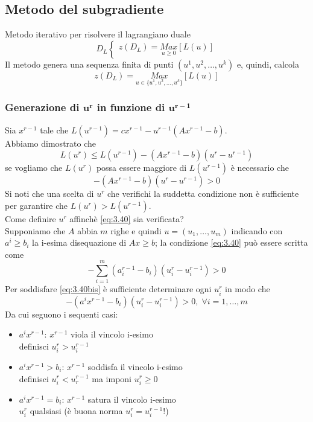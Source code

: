 \subsection{Metodo del subgradiente}
Metodo iterativo per risolvere il lagrangiano duale
\begin{equation*}
	D_{L}
	\begin{cases}
		z(D_{L})=\underset{u\ge 0}{Max}[L(u)]
	\end{cases}
\end{equation*}
Il metodo genera una sequenza finita di punti $(u^{1},u^{2},\dots,u^{k})$ e, quindi, calcola
\begin{equation*}
	z(D_{L})=\underset{u\in \{u^{1},u^{2},\dots,u^{k}\}}{Max}[L(u)]
\end{equation*}
\subsubsection{Generazione di $\boldsymbol{u^{r}}$ in funzione di $\boldsymbol{u^{r-1}}$}
Sia $x^{r-1}$ tale che $L(u^{r-1})=cx^{r-1}-u^{r-1}(Ax^{r-1}-b)$.\\
Abbiamo dimostrato che
\begin{equation}
	L(u^{r})\le L(u^{r-1})-(Ax^{r-1}-b)(u^{r}-u^{r-1})
\end{equation}
se vogliamo che $L(u^{r})$ possa essere maggiore di $L(u^{r-1})$ è necessario che
\begin{equation}
	-(Ax^{r-1}-b)(u^{r}-u^{r-1})>0 \label{eq:3.40}
\end{equation}
Si noti che una scelta di $u^{r}$ che verifichi la suddetta condizione non è sufficiente per garantire che $L(u^{r})>L(u^{r-1})$.\\
Come definire $u^{r}$ affinchè \ref{eq:3.40} sia verificata?\\
Supponiamo che $A$ abbia $m$ righe e quindi $u=(u_{1},\dots,u_{m})$ indicando con $a^{i}\ge b_{i}$ la i-esima disequazione di $Ax\ge b$; la condizione \ref{eq:3.40} può essere scritta come
\begin{equation*}
	-\sum_{i=1}^{m}(a_{i}^{r-1}-b_{i})(u_{i}^{r}-u_{i}^{r-1})>0 \label{eq:3.40bis}
\end{equation*}
Per soddisfare \ref{eq:3.40bis} è sufficiente determinare ogni $u_{i}^{r}$ in modo che
\begin{equation}
	-(a^{i}x^{r-1}-b_{i})(u_{i}^{r}-u_{i}^{r-1})>0,\;\forall i=1,\dots,m
\end{equation}
Da cui seguono i sequenti casi:

\begin{itemize}
	\item $a^{i}x^{r-1}$: $x^{r-1}$ viola il vincolo i-esimo \\
	definisci $u_{i}^{r}>u_{i}^{r-1}$
	\item $a^{i}x^{r-1}>b_{i}$: $x^{r-1}$ soddisfa il vincolo i-esimo \\
	definisci $u_{i}^{r}<u_{r}^{r-1}$ ma imponi $u_{i}^{r}\ge 0$
	\item $a^{i}x^{r-1}=b_{i}$: $x^{r-1}$ satura il vincolo i-esimo \\
	$u_{i}^{r}$ qualsiasi (è buona norma $u_{i}^{r}=u_{i}^{r-1}$!)
\end{itemize}

